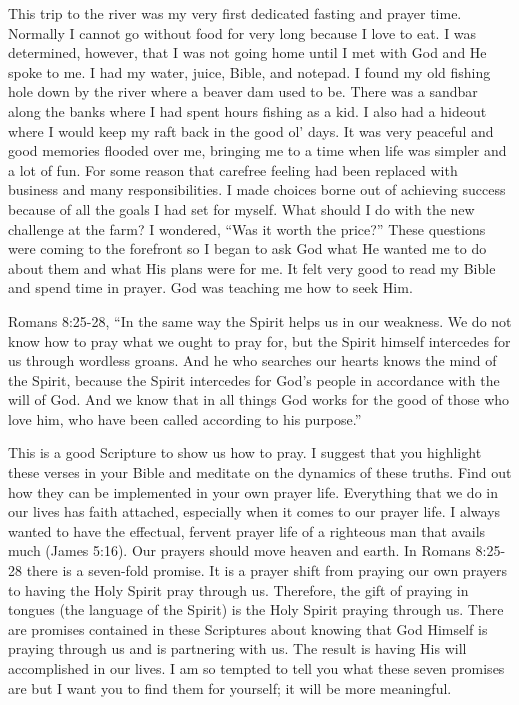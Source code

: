 \documentclass[twoside, 12pt]{book}
\begin{document}
This trip to the river was my very first dedicated fasting and prayer time. Normally I cannot go without food for very long because I love to eat. I was determined, however, that I was not going home until I met with God and He spoke to me. I had my water, juice, Bible, and notepad. I found my old fishing hole down by the river where a beaver dam used to be. There was a sandbar along the banks where I had spent hours fishing as a kid. I also had a hideout where I would keep my raft back in the good ol' days. It was very peaceful and good memories flooded over me, bringing me to a time when life was simpler and a lot of fun. For some reason that carefree feeling had been replaced with business and many responsibilities. I made choices borne out of achieving success because of all the goals I had set for myself. What should I do with the new challenge at the farm? I wondered, “Was it worth the price?” These questions were coming to the forefront so I began to ask God what He wanted me to do about them and what His plans were for me. It felt very good to read my Bible and spend time in prayer. God was teaching me how to seek Him.

Romans 8:25-28, “In the same way the Spirit helps us in our weakness. We do not know how to pray what we ought to pray for, but the Spirit himself intercedes for us through wordless groans. And he who searches our hearts knows the mind of the Spirit, because the Spirit intercedes for God’s people in accordance with the will of God. And we know that in all things God works for the good of those who love him, who have been called according to his purpose.” 

This is a good Scripture to show us how to pray. I suggest that you highlight these verses in your Bible and meditate on the dynamics of these truths. Find out how they can be implemented in your own prayer life. Everything that we do in our lives has faith attached, especially when it comes to our prayer life. I always wanted to have the effectual, fervent prayer life of a righteous man that avails much (James 5:16). Our prayers should move heaven and earth. In Romans 8:25-28 there is a seven-fold promise. It is a prayer shift from praying our own prayers to having the Holy Spirit pray through us. Therefore, the gift of praying in tongues (the language of the Spirit) is the Holy Spirit praying through us. There are promises contained in these Scriptures about knowing that God Himself is praying through us and is partnering with us. The result is having His will accomplished in our lives. I am so tempted to tell you what these seven promises are but I want you to find them for yourself; it will be more meaningful.
\end{document}
